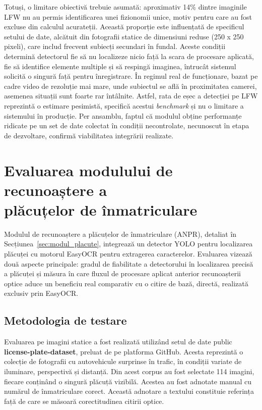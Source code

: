 \documentclass[../../main.tex]{subfiles}
\begin{document}
Totuși, o limitare obiectivă trebuie asumată: aproximativ 14\% dintre imaginile LFW nu au permis identificarea unei fizionomii unice, motiv pentru care au fost excluse din calculul acurateții. Această proporție este influențată de specificul setului de date, alcătuit din fotografii statice de dimensiuni reduse (250 x 250 pixeli), care includ frecvent subiecți secundari în fundal. Aceste condiții determină detectorul fie să nu localizeze nicio față la scara de procesare aplicată, fie să identifice elemente multiple și să respingă imaginea, întrucât sistemul solicită o singură față pentru înregistrare. În regimul real de funcționare, bazat pe cadre video de rezoluție mai mare, unde subiectul se află în proximitatea camerei, asemenea situații sunt foarte rar întâlnite. Astfel, rata de eșec a detecției pe LFW reprezintă o estimare pesimistă, specifică acestui
\emph{benchmark} și nu o limitare a sistemului în producție. Per ansamblu, faptul că modulul obține performanțe ridicate pe un set de date colectat în condiții necontrolate, necunoscut în etapa de dezvoltare, confirmă viabilitatea integrării realizate.

\section{Evaluarea modulului de recunoaștere a \\ plăcuțelor de înmatriculare}
\label{sec:eval_placute}

Modulul de recunoaștere a plăcuțelor de înmatriculare (ANPR), detaliat în \linebreak Secțiunea~\ref{sec:modul_placute}, integrează un detector YOLO pentru localizarea plăcuței cu motorul EasyOCR pentru extragerea caracterelor. Evaluarea vizează două aspecte principale: gradul de fiabilitate a detectorului în localizarea precisă a plăcuței și măsura în care fluxul de procesare aplicat anterior recunoașterii optice aduce un beneficiu real comparativ cu o citire de bază, directă, realizată exclusiv prin EasyOCR.

\subsection{Metodologia de testare}
\label{subsec:metodologie_placute}

Evaluarea pe imagini statice a fost realizată utilizând setul de date public \textbf{license-plate-dataset}, preluat de pe platforma GitHub. Acesta reprezintă o colecție de fotografii cu autovehicule surprinse în trafic, în condiții variate de iluminare, perspectivă și distanță. Din acest corpus au fost selectate 114 imagini, fiecare conținând o singură plăcuță vizibilă. Acestea au fost adnotate manual cu numărul de înmatriculare corect. Această adnotare a textului constituie referința față de care se măsoară corectitudinea citirii optice.
\end{document}
